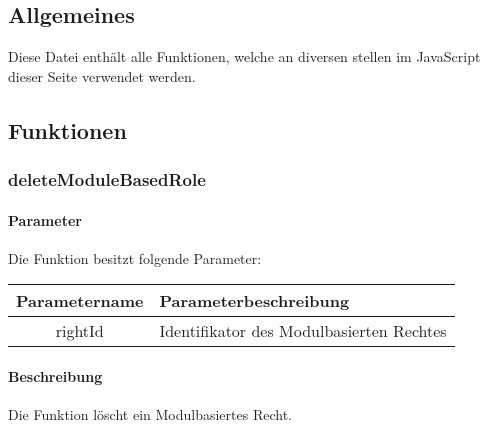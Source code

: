 \subsection{Allgemeines} Diese Datei enthält alle Funktionen, welche an diversen stellen im JavaScript dieser Seite verwendet werden.
\subsection{Funktionen}
\subsubsection{deleteModuleBasedRole}
\paragraph{Parameter} Die Funktion besitzt folgende Parameter:
\begin{table}[H]
	\begin{tabular}{|c|p{11cm}|}
		\hline
		\textbf{Parametername} & \textbf{Parameterbeschreibung} \\ \hline
		rightId & Identifikator des Modulbasierten Rechtes \\ \hline
	\end{tabular}
\end{table}
\paragraph{Beschreibung} Die Funktion löscht ein Modulbasiertes Recht.